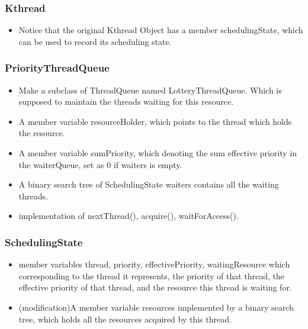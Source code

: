 \documentclass{article}
\begin{document}
	\subsubsection{Kthread}
	
	\begin{itemize}
		\item Notice that the original Kthread Object has a member schedulingState, which can be used to record its scheduling state.
	\end{itemize}
	\subsubsection{PriorityThreadQueue}
	
	\begin{itemize}
		\item Make a subclass of ThreadQueue named LotteryThreadQueue. Which is supposed to maintain the threads waiting for this resource.
		
		\item A member variable resourceHolder, which points to the thread which holds the resource.
		
		\item A member variable sumPriority, which denoting the sum effective priority in the waiterQueue, set as 0 if waiters is empty.
		
		\item A binary search tree of SchedulingState waiters contains all the waiting threads.
		
		\item implementation of nextThread(), acquire(), waitForAccess().
	\end{itemize}
	
	\subsubsection{SchedulingState}
	
	\begin{itemize}
		\item member variables thread, priority, effectivePriority, waitingResource which corresponding to the thread it represents, the priority of that thread, the effective priority of that thread, and the resource this thread is waiting for.
		
		\item (modification)A member variable resources implemented by a binary search tree, which holds all the resources acquired by this thread.
	\end{itemize}
\end{document}
